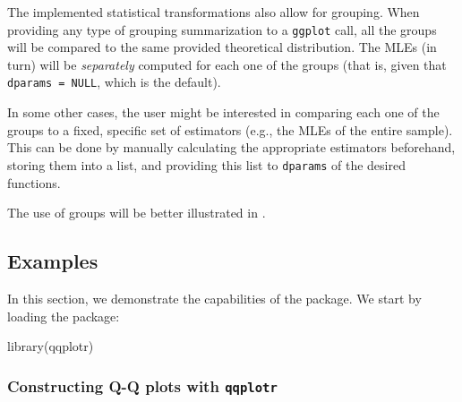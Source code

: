 
The implemented statistical transformations also allow for grouping.
When providing any type of grouping summarization to a \texttt{ggplot}
call, all the groups will be compared to the same provided theoretical
distribution. The MLEs (in turn) will be \emph{separately} computed for
each one of the groups (that is, given that \texttt{dparams\ =\ NULL},
which is the default).

In some other cases, the user might be interested in comparing each one
of the groups to a fixed, specific set of estimators (e.g., the MLEs of
the entire sample). This can be done by manually calculating the
appropriate estimators beforehand, storing them into a list, and
providing this list to \texttt{dparams} of the desired 
functions.

The use of groups will be better illustrated in .

\FloatBarrier

\subsection{Examples}\label{examples}

\label{sec:examples}

In this section, we demonstrate the capabilities of the 
package. We start by loading the package:

\begin{Schunk}
\begin{Sinput}
library(qqplotr)
\end{Sinput}
\end{Schunk}

\subsubsection{\texorpdfstring{Constructing Q-Q plots with
\texttt{qqplotr}}{Constructing Q-Q plots with qqplotr}}\label{constructing-q-q-plots-with-qqplotr}


